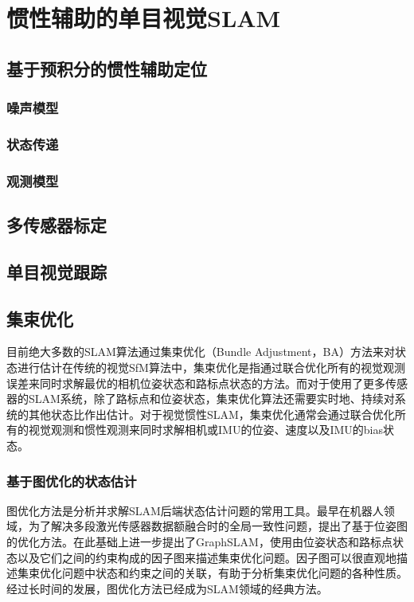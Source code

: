\chapter{惯性辅助的单目视觉SLAM}

\section{基于预积分的惯性辅助定位}
\subsection{噪声模型}
\subsection{状态传递}
\subsection{观测模型}

\section{多传感器标定}

\section{单目视觉跟踪}

\section{集束优化}

目前绝大多数的SLAM算法通过集束优化\citep{triggs1999bundle}（Bundle Adjustment，BA）方法来对状态进行估计在传统的视觉SfM算法中，集束优化是指通过联合优化所有的视觉观测误差来同时求解最优的相机位姿状态和路标点状态的方法。而对于使用了更多传感器的SLAM系统，除了路标点和位姿状态，集束优化算法还需要实时地、持续对系统的其他状态比作出估计。对于视觉惯性SLAM，集束优化通常会通过联合优化所有的视觉观测和惯性观测来同时求解相机或IMU的位姿、速度以及IMU的bias状态。

\subsection{基于图优化的状态估计}

图优化方法是分析并求解SLAM后端状态估计问题的常用工具。最早在机器人领域，为了解决多段激光传感器数据额融合时的全局一致性问题，\citep{lu1997globally,lu1997robot}提出了基于位姿图的优化方法。\citeauthor{thrun2006graph}在此基础上进一步提出了GraphSLAM\citep{thrun2006graph}，使用由位姿状态和路标点状态以及它们之间的约束构成的因子图来描述集束优化问题。因子图可以很直观地描述集束优化问题中状态和约束之间的关联，有助于分析集束优化问题的各种性质。经过长时间的发展，图优化方法已经成为SLAM领域的经典方法。

